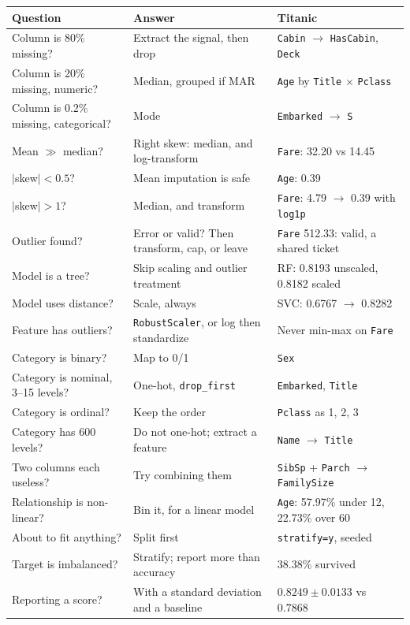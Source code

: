 \documentclass[11pt,a4paper]{article}
\begin{document}
\begin{tabularx}{\textwidth}{@{}l X X@{}}
\toprule
\rowcolor{tablehead} \textbf{Question} & \textbf{Answer} & \textbf{Titanic} \\
\midrule
Column is 80\% missing? & Extract the signal, then drop & \texttt{Cabin} $\rightarrow$ \texttt{HasCabin}, \texttt{Deck} \\
Column is 20\% missing, numeric? & Median, grouped if MAR & \texttt{Age} by \texttt{Title} $\times$ \texttt{Pclass} \\
Column is 0.2\% missing, categorical? & Mode & \texttt{Embarked} $\rightarrow$ \texttt{S} \\
Mean $\gg$ median? & Right skew: median, and log-transform & \texttt{Fare}: 32.20 vs 14.45 \\
$|$skew$| < 0.5$? & Mean imputation is safe & \texttt{Age}: 0.39 \\
$|$skew$| > 1$? & Median, and transform & \texttt{Fare}: 4.79 $\rightarrow$ 0.39 with \lstinline|log1p| \\
Outlier found? & Error or valid? Then transform, cap, or leave & \texttt{Fare} 512.33: valid, a shared ticket \\
Model is a tree? & Skip scaling and outlier treatment & RF: 0.8193 unscaled, 0.8182 scaled \\
Model uses distance? & Scale, always & SVC: 0.6767 $\rightarrow$ 0.8282 \\
Feature has outliers? & \lstinline|RobustScaler|, or log then standardize & Never min-max on \texttt{Fare} \\
Category is binary? & Map to 0/1 & \texttt{Sex} \\
Category is nominal, 3--15 levels? & One-hot, \lstinline|drop_first| & \texttt{Embarked}, \texttt{Title} \\
Category is ordinal? & Keep the order & \texttt{Pclass} as 1, 2, 3 \\
Category has 600 levels? & Do not one-hot; extract a feature & \texttt{Name} $\rightarrow$ \texttt{Title} \\
Two columns each useless? & Try combining them & \texttt{SibSp} + \texttt{Parch} $\rightarrow$ \texttt{FamilySize} \\
Relationship is non-linear? & Bin it, for a linear model & \texttt{Age}: 57.97\% under 12, 22.73\% over 60 \\
About to fit anything? & Split first & \lstinline|stratify=y|, seeded \\
Target is imbalanced? & Stratify; report more than accuracy & 38.38\% survived \\
Reporting a score? & With a standard deviation and a baseline & $0.8249 \pm 0.0133$ vs 0.7868 \\
\bottomrule
\end{tabularx}

\vspace{1em}

\end{document}
